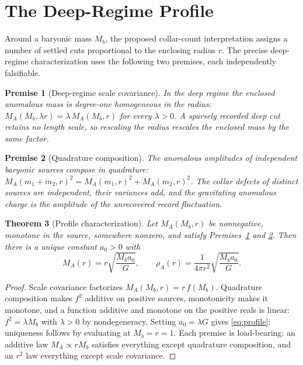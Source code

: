 \documentclass[11pt]{article}
\newtheorem{theorem}{Theorem}[section]
\newtheorem{premise}[theorem]{Premise}
\begin{document}
\section{The Deep-Regime Profile}
\label{sec:deep}

Around a baryonic mass \(M_b\), the proposed collar-count interpretation
assigns a number of settled cuts proportional to the enclosing radius
\(r\). The precise deep-regime characterization uses the following two
premises, each independently falsifiable.

\begin{premise}[Deep-regime scale covariance]
\label{pre:cov}
In the deep regime the enclosed anomalous mass is degree-one homogeneous in
the radius: \(M_A(M_b,\lambda r)=\lambda\,M_A(M_b,r)\) for every
\(\lambda>0\). A sparsely recorded deep cut retains no length scale, so
rescaling the radius rescales the enclosed mass by the same factor.
\end{premise}

\begin{premise}[Quadrature composition]
\label{pre:quad}
The anomalous amplitudes of independent baryonic sources compose in
quadrature:
\(M_A(m_1+m_2,r)^2=M_A(m_1,r)^2+M_A(m_2,r)^2\). The collar defects of
distinct sources are independent, their variances add, and the gravitating
anomalous charge is the amplitude of the unrecovered record fluctuation.
\end{premise}

\begin{theorem}[Profile characterization]
\label{thm:char}
Let \(M_A(M_b,r)\) be nonnegative, monotone in the source, somewhere
nonzero, and satisfy Premises~\ref{pre:cov} and \ref{pre:quad}. Then there
is a unique constant \(a_0>0\) with
\begin{equation}
M_A(r)=r\sqrt{\frac{M_ba_0}{G}},
\qquad
\rho_A(r)=\frac{1}{4\pi r^2}\sqrt{\frac{M_ba_0}{G}}.
\label{eq:profile}
\end{equation}
\end{theorem}

\begin{proof}
Scale covariance factorizes \(M_A(M_b,r)=r\,f(M_b)\). Quadrature
composition makes \(f^2\) additive on positive sources, monotonicity makes
it monotone, and a function additive and monotone on the positive reals is
linear: \(f^2=\lambda M_b\) with \(\lambda>0\) by nondegeneracy. Setting
\(a_0=\lambda G\) gives \eqref{eq:profile}; uniqueness follows by
evaluating at \(M_b=r=1\). Each premise is load-bearing: an additive law
\(M_A\propto rM_b\) satisfies everything except quadrature composition, and
an \(r^2\) law everything except scale covariance.
\end{proof}
\end{document}

